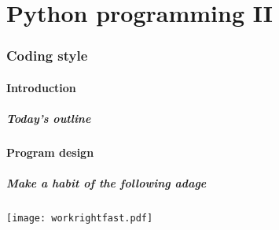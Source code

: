 \part{Python programming II}
\section{Coding style}
\subsection*{Introduction}
\begin{frame}[label=contents_prog2]
  \frametitle{Today's outline}
\end{frame}

\subsection*{Program design}
\begin{frame}[label=workrightfast]
  \frametitle{Make a habit of the following adage}
  \begin{center}
    \texttt{[image: workrightfast.pdf]}
  \end{center}
\end{frame}

